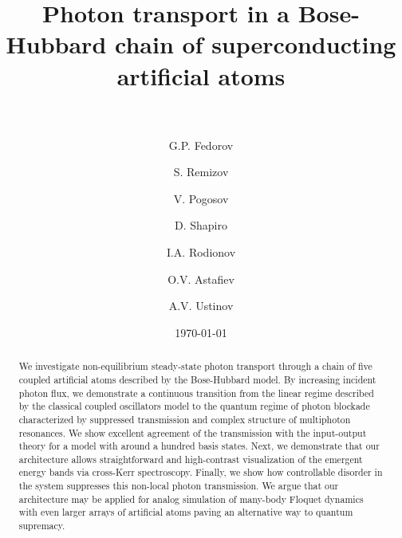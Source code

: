 \documentclass[%
 aps, pra,
 amsmath,amssymb,
 reprint,%
superscriptaddress
]{revtex4-2}
\newcommand{\mytitile}{Photon transport in a Bose-Hubbard chain of superconducting artificial atoms}
\begin{document}
	
	\title[\mytitile]{\mytitile\\~}
	\author{G.P. Fedorov}
	
	\author{S. Remizov}
	\author{V. Pogosov}
	\author{D. Shapiro}

	\author{I.A. Rodionov}

	\author{O.V. Astafiev}

	\author{A.V. Ustinov}
	
	
	\date{\today}%
	
	
	\begin{abstract}
We investigate non-equilibrium steady-state photon transport through a chain of five coupled artificial atoms described by the Bose-Hubbard model. By increasing incident photon flux, we demonstrate a continuous transition from the linear regime described by the classical coupled oscillators model to the quantum regime of photon blockade characterized by suppressed transmission and complex structure of multiphoton resonances. We show excellent agreement of the transmission with the input-output theory for a model with around a hundred basis states. Next, we demonstrate that our architecture allows straightforward and high-contrast visualization of the emergent energy bands via cross-Kerr spectroscopy. Finally, we show how controllable disorder in the system suppresses this non-local photon transmission. We argue that our architecture may be applied for analog simulation of many-body Floquet dynamics with even larger arrays of artificial atoms paving an alternative way to quantum supremacy.
\end{abstract}
	
\end{document}
